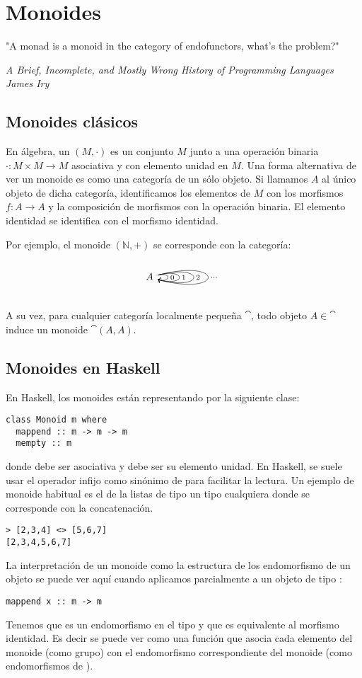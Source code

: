 \chapter{Monoides}
\epigraph{"A monad is a monoid in the category of endofunctors, what's the problem?"}{\textit{A Brief, Incomplete, and Mostly Wrong History of Programming Languages\\James Iry}}
\section{Monoides clásicos}
En álgebra, un  $(M,\cdot)$ es un conjunto $M$ junto a una operación binaria $\cdot \colon M \times M \to M$ asociativa y con elemento unidad en $M$.
Una forma alternativa de ver un monoide es como una categoría de un sólo objeto.
Si llamamos $A$ al único objeto de dicha categoría, identificamos los elementos de $M$ con los morfismos $f \colon A \to A$ y la composición de morfismos con la operación binaria.
El elemento identidad se identifica con el morfismo identidad.

Por ejemplo, el monoide $(\mathbb{N},+)$ se corresponde con la categoría:
\[
\begin{tikzcd}
A \arrow[loop right,"0" right] \arrow[loop right,distance=3em,"1" right] \arrow[loop right,distance=5em,"2" right]
\arrow[loop right,distance=7em,"\dots" right]
\end{tikzcd}
\]

A su vez, para cualquier categoría localmente pequeña $\cat$, todo objeto $A \in \cat$ induce un monoide $\cat(A,A)$.

\section{Monoides en Haskell}
En Haskell, los monoides están representando por la siguiente clase:
\begin{verbatim}
class Monoid m where
  mappend :: m -> m -> m
  mempty :: m
\end{verbatim}
donde  debe ser asociativa y  debe ser su elemento unidad.
En Haskell, se suele usar el operador infijo \code{<>} como sinónimo de  para facilitar la lectura.
Un ejemplo de monoide habitual es el de la listas de tipo un tipo cualquiera  donde  se corresponde con la concatenación.
\begin{verbatim}
> [2,3,4] <> [5,6,7]
[2,3,4,5,6,7]
\end{verbatim}
La interpretación de un monoide como la estructura de los endomorfismo de un objeto se puede ver aquí cuando aplicamos parcialmente  a un objeto  de tipo :
\begin{verbatim}
mappend x :: m -> m
\end{verbatim}
Tenemos que  es un endomorfismo en el tipo  y que  es equivalente al morfismo identidad.
Es decir  se puede ver como una función que asocia cada elemento del monoide (como grupo) con el endomorfismo correspondiente del monoide (como endomorfismos de ).

